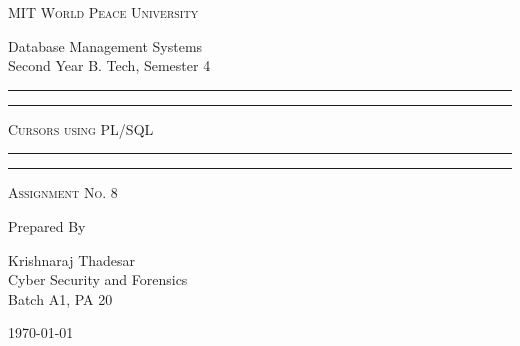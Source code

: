 \documentclass[11pt]{article}
\begin{document}
\begin{titlepage}
    \centering


    \huge\textsc{
        MIT World Peace University
    }\\

    \vspace{0.75\baselineskip} %

    \LARGE{
        Database Management Systems\\
        Second Year B. Tech, Semester 4
    }

    \vfill %


    \rule{\textwidth}{1.6pt}\vspace*{-\baselineskip}\vspace*{2pt}
    \rule{\textwidth}{0.6pt}
    \vspace{0.75\baselineskip} %



    \huge{\textsc{
            Cursors using PL/SQL
        }} \\



    \vspace{0.5\baselineskip} %
    \rule{\textwidth}{0.6pt}\vspace*{-\baselineskip}\vspace*{2.8pt}
    \rule{\textwidth}{1.6pt}

    \vspace{1\baselineskip} %


    \LARGE\textsc{
        Assignment No. 8
    } %
    \vfill


    Prepared By
    \vspace{0.5\baselineskip} %

    \Large{
        Krishnaraj Thadesar \\
        Cyber Security and Forensics\\
        Batch A1, PA 20
    }


    \vspace{0.5\baselineskip} %
    \today

\end{titlepage}
\end{document}
